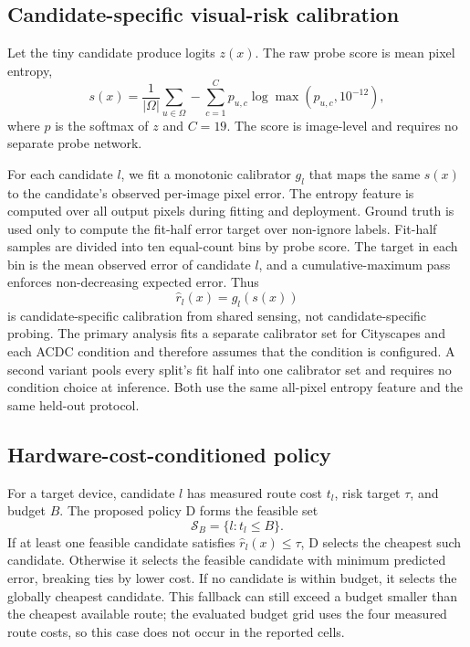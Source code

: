 \documentclass[a4paper,review,12pt]{elsarticle}
\begin{document}
\subsection{Candidate-specific visual-risk calibration}
\label{sec:calibration}

Let the tiny candidate produce logits $z(x)$. The raw probe score is mean pixel entropy,
\begin{equation}
s(x)=\frac{1}{|\Omega|}\sum_{u\in\Omega}-\sum_{c=1}^{C}p_{u,c}\log\max(p_{u,c},10^{-12}),
\label{eq:entropy}
\end{equation}
where $p$ is the softmax of $z$ and $C=19$. The score is image-level and requires no separate probe network.

For each candidate $l$, we fit a monotonic calibrator $g_l$ that maps the same $s(x)$ to the candidate's observed per-image pixel error. The entropy feature is computed over all output pixels during fitting and deployment. Ground truth is used only to compute the fit-half error target over non-ignore labels. Fit-half samples are divided into ten equal-count bins by probe score. The target in each bin is the mean observed error of candidate $l$, and a cumulative-maximum pass enforces non-decreasing expected error. Thus
\begin{equation}
\widehat{r}_l(x)=g_l(s(x))
\label{eq:risk}
\end{equation}
is candidate-specific calibration from shared sensing, not candidate-specific probing. The primary analysis fits a separate calibrator set for Cityscapes and each ACDC condition and therefore assumes that the condition is configured. A second variant pools every split's fit half into one calibrator set and requires no condition choice at inference. Both use the same all-pixel entropy feature and the same held-out protocol.

\subsection{Hardware-cost-conditioned policy}
\label{sec:policy}

For a target device, candidate $l$ has measured route cost $t_l$, risk target $\tau$, and budget $B$. The proposed policy D forms the feasible set
\begin{equation}
\mathcal{S}_B=\{l:t_l\leq B\}.
\label{eq:feasible}
\end{equation}
If at least one feasible candidate satisfies $\widehat{r}_l(x)\leq\tau$, D selects the cheapest such candidate. Otherwise it selects the feasible candidate with minimum predicted error, breaking ties by lower cost. If no candidate is within budget, it selects the globally cheapest candidate. This fallback can still exceed a budget smaller than the cheapest available route; the evaluated budget grid uses the four measured route costs, so this case does not occur in the reported cells.
\end{document}
